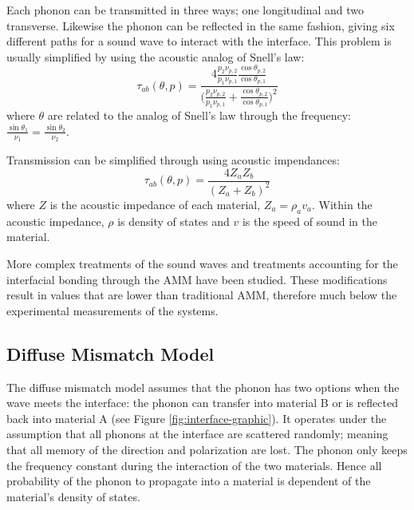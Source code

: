 Each phonon can be transmitted in three ways; one longitudinal and two transverse. Likewise the phonon can be reflected in the same fashion, giving six different paths for a sound wave to interact with the interface. This problem is usually simplified by using the acoustic analog of Snell’s law:
\begin{equation}
\tau_{ab}(\theta, p) = \frac{4\frac{p_2 \nu_{p, 2}}{p_1 \nu_{p,1}} \frac{\cos{\theta_{p,2}}}{\cos{\theta_{p,1}}}}{\big( \frac{p_2 \nu_{p, 2}}{p_1 \nu_{p,1}}+ \frac{\cos{\theta_{p,2}}}{\cos{\theta_{p,1}}}\big)^2}
\end{equation}
where $\theta$ are related to the analog of Snell's law through the frequency: \(\frac{\sin{\theta_1}}{\nu_1} = \frac{\sin{\theta_2}}{\nu_2}\).

Transmission can be simplified through using acoustic impendances:
\begin{equation}
\tau_{ab}(\theta, p) = \frac{4Z_a Z_b}{(Z_a +Z_b)^2}
\end{equation}
where $Z$ is the acoustic impedance of each material, $Z_a = \rho_a v_a$. Within the acoustic impedance, $\rho$ is density of states and $v$ is the speed of sound in the material. 

More complex treatments of the sound waves\cite{Prasher2000} and treatments accounting for the interfacial bonding\cite{Prasher2009} through the AMM have been studied. These modifications result in values that are lower than traditional AMM, therefore much below the experimental measurements of the systems.\cite{Cahill2006, Stoner1993}

\subsection{Diffuse Mismatch Model}
The diffuse mismatch model assumes that the phonon has two options when the wave meets the interface: the phonon can transfer into material B or is reflected back into material A (see Figure \ref{fig:interface-graphic}). It operates under the assumption that all phonons at the interface are scattered randomly; meaning that all memory of the direction and polarization are lost. The phonon only keeps the frequency constant during the interaction of the two materials. Hence all probability of the phonon to propagate into a material is dependent of the material's density of states. 

